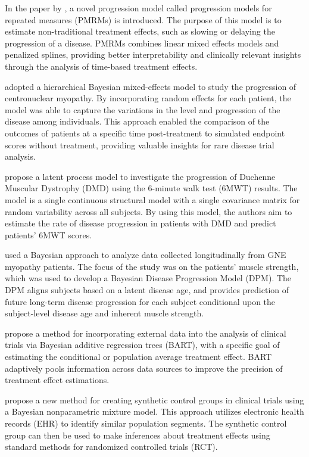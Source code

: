 In the paper by \cite{raket2022progression}, a novel progression model called progression models for repeated measures (PMRMs) is introduced. The purpose of this model is to estimate non-traditional treatment effects, such as slowing or delaying the progression of a disease. PMRMs combines linear mixed effects models and penalized splines, providing better interpretability and clinically relevant insights through the analysis of time-based treatment effects.

\cite{fouarge2021hierarchical} adopted a hierarchical Bayesian mixed-effects model to study the progression of centronuclear myopathy. By incorporating random effects for each patient, the model was able to capture the variations in the level and progression of the disease among individuals. This approach enabled the comparison of the outcomes of patients at a specific time post-treatment to simulated endpoint scores without treatment, providing valuable insights for rare disease trial analysis.

\cite{lennie2020latent} propose a latent process model to investigate the progression of Duchenne Muscular Dystrophy (DMD) using the 6-minute walk test (6MWT) results. The model is a single continuous structural model with a single covariance matrix for random variability across all subjects. By using this model, the authors aim to estimate the rate of disease progression in patients with DMD and predict patients' 6MWT scores.

\cite{quintana2019bayesian} used a Bayesian approach to analyze data collected longitudinally from GNE myopathy patients. The focus of the study was on the patients' muscle strength, which was used to develop a Bayesian Disease Progression Model (DPM). The DPM aligns subjects based on a latent disease age, and provides prediction of future long-term disease progression for each subject conditional upon the subject-level disease age and inherent muscle strength. 

\cite{zhou2021incorporating} propose a method for incorporating external data into the analysis of clinical trials via Bayesian additive regression trees (BART), with a specific goal of estimating the conditional or population average treatment effect. BART adaptively pools information across data sources to improve the precision of treatment effect estimations. 

\cite{kiran2021bayesian} propose a new method for creating synthetic control groups in clinical trials using a Bayesian nonparametric mixture model. This approach utilizes electronic health records (EHR) to identify similar population segments. The synthetic control group can then be used to make inferences about treatment effects using standard methods for randomized controlled trials (RCT).

